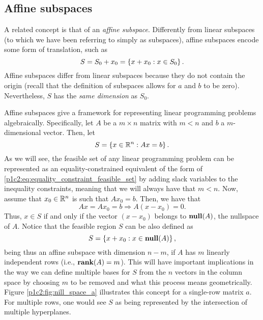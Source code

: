 \subsection{Affine subspaces}

A related concept is that of an \emph{affine subspace}. Differently from linear subspaces (to which we have been referring to simply as subspaces), affine subspaces encode some form of translation, such as  
%
\begin{equation*}
	S = S_0 + x_0 = \left\{ x + x_0 : x \in S_0 \right \}.
\end{equation*}
%
Affine subspaces differ from linear subspaces because they do not contain the origin (recall that the definition of subspaces allows for $a$ and $b$ to be zero). Nevertheless, $S$ has the \emph{same dimension} as $S_0$.

Affine subspaces give a framework for representing linear programming problems algebraically. Specifically, let $A$ be a $m \times n$ matrix with $m < n$ and $b$ a $m$-dimensional vector. Then, let 
%
\begin{equation} \label{p1c2:eq:equality_constraint_feasible_set}
	S = \left\{ x \in \mathbb{R}^n : Ax = b \right \}.		
\end{equation}
%
As we will see, the feasible set of any linear programming problem can be represented as an equality-constrained equivalent of the form of \eqref{p1c2:eq:equality_constraint_feasible_set} by adding slack variables to the inequality constraints, meaning that we will always have that $m < n$.  Now, assume that $x_0 \in \mathbb{R}^n$ is such that $Ax_0 = b$.  Then, we have that 
%
\begin{equation*}
	Ax = Ax_0 = b \Rightarrow A(x - x_0) = 0.	
\end{equation*}
%
Thus, $x \in S$ if and only if the vector $(x - x_0)$ belongs to $\mathop{\bf null}(A)$, the nullspace of $A$. Notice that the feasible region $S$ can be also defined as 
%
\begin{equation*}
	S = \left\{ x + x_0 : x \in \mathop{\bf null}(A) \right \},	
\end{equation*}
%
being thus an affine subspace with dimension $n-m$, if $A$ has $m$ linearly independent rows (i.e., $\mathop{\bf rank}(A)=m$). This will have important implications in the way we can define multiple bases for $S$ from the $n$ vectors in the column space by choosing $m$ to be removed and what this process means geometrically. Figure \ref{p1c2:fig:nill_space_a} illustrates this concept for a single-row matrix $a$. For multiple rows, one would see $S$ as being represented by the intersection of multiple hyperplanes.

